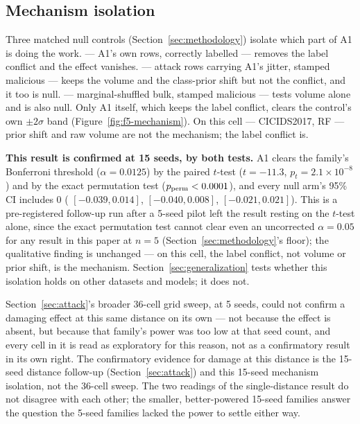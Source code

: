 \subsection{Mechanism isolation}
Three matched null controls (Section~\ref{sec:methodology}) isolate which part of A1 is doing
the work.  — A1's own rows, correctly labelled — removes the label conflict and
the effect vanishes.  — attack rows carrying A1's jitter, stamped malicious — keeps
the volume and the class-prior shift but not the conflict, and it too is null.  —
marginal-shuffled bulk, stamped malicious — tests volume alone and is also null. Only A1 itself,
which keeps the label conflict, clears the control's own $\pm2\sigma$ band
(Figure~\ref{fig:f5-mechanism}). On this cell — CICIDS2017, RF — prior shift and raw volume are
not the mechanism; the label conflict is.

\textbf{This result is confirmed at 15 seeds, by both tests.} A1 clears the family's Bonferroni
threshold ($\alpha=0.0125$) by the paired $t$-test ($t=-11.3$, $p_t=2.1\times10^{-8}$) and by the
exact permutation test ($p_{\rm perm}<0.0001$), and every null arm's 95\% CI includes 0
( $[-0.039, 0.014]$,  $[-0.040, 0.008]$, 
$[-0.021, 0.021]$). This is a pre-registered follow-up run after a 5-seed pilot left the result
resting on the $t$-test alone, since the exact permutation test cannot clear even an uncorrected
$\alpha=0.05$ for any result in this paper at $n=5$ (Section~\ref{sec:methodology}'s floor); the
qualitative finding is unchanged — on this cell, the label conflict, not volume or prior shift,
is the mechanism. Section~\ref{sec:generalization} tests whether this isolation holds on other
datasets and models; it does not.

Section~\ref{sec:attack}'s broader 36-cell grid sweep, at 5 seeds, could not confirm a damaging
effect at this same distance on its own — not because the effect is absent, but because that
family's power was too low at that seed count, and every cell in it is read as exploratory for
this reason, not as a confirmatory result in its own right. The confirmatory evidence for
damage at this distance is the 15-seed distance follow-up (Section~\ref{sec:attack}) and this
15-seed mechanism isolation, not the 36-cell sweep. The two readings of the single-distance
result do not disagree with each other; the smaller, better-powered 15-seed families answer the
question the 5-seed families lacked the power to settle either way.

